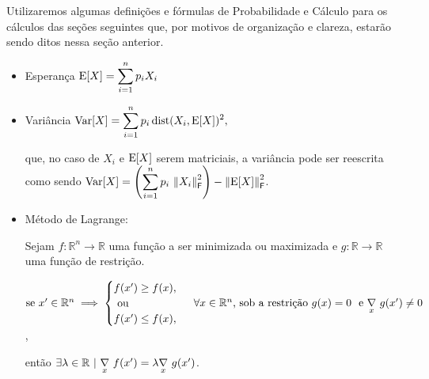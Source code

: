 
Utilizaremos algumas definições e fórmulas de Probabilidade e Cálculo para os cálculos das seções seguintes que, por motivos de organização e clareza, estarão sendo ditos nessa seção anterior.

\begin{itemize}
  \item Esperança $\displaystyle \text{E}[X] = \sum_{i=1}^{n} p_i X_i$
  \item Variância $\displaystyle \text{Var}[X] = \sum_{i=1}^{n} p_i \, \text{dist}(X_i, \text{E}[X])^2,$

  que, no caso de $X_i$ e $\text{E}[X]$ serem matriciais, a variância pode ser reescrita como sendo $\displaystyle \text{Var}[X] = \left(\sum_{i=1}^{n} p_i \, \left\lVert X_i\right\rVert_\mathsf{F}^2\right) - \left\lVert\text{E}[X]\right\rVert_\mathsf{F}^2$.

  \item Método de Lagrange:

    Sejam $f : \mathbb{R}^n \to \mathbb{R}$ uma função a ser minimizada ou maximizada e $g : \mathbb{R} \to \mathbb{R}$ uma função de restrição.

    $\text{se }x' \in \mathbb{R}^n \implies \begin{cases} f(x') \geq f(x), \\ \text{ ou } \\ f(x') \leq f(x), \end{cases} \,\, \forall x \in \mathbb{R}^n\text{, sob a restrição } g(x) = 0 \,\, \text{ e } \underset{x}{\nabla}\,\, g(x') \neq 0$,

    então $\exists \lambda \in \mathbb{R} \,\,|\,\, \underset{x}{\nabla}\,\, f(x') = \lambda \underset{x}{\nabla}\,\, g(x')$.
\end{itemize}